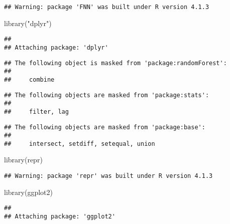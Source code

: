 \documentclass[
]{article}
\newenvironment{Shaded}{\begin{snugshade}}{\end{snugshade}}
\newcommand{\FunctionTok}[1]{\textcolor[rgb]{0.00,0.00,0.00}{#1}}
\newcommand{\NormalTok}[1]{#1}
\newcommand{\StringTok}[1]{\textcolor[rgb]{0.31,0.60,0.02}{#1}}
\begin{document}
\begin{verbatim}
## Warning: package 'FNN' was built under R version 4.1.3
\end{verbatim}

\begin{Shaded}
\begin{Highlighting}[]
\FunctionTok{library}\NormalTok{(}\StringTok{"dplyr"}\NormalTok{)    }
\end{Highlighting}
\end{Shaded}

\begin{verbatim}
## 
## Attaching package: 'dplyr'
\end{verbatim}

\begin{verbatim}
## The following object is masked from 'package:randomForest':
## 
##     combine
\end{verbatim}

\begin{verbatim}
## The following objects are masked from 'package:stats':
## 
##     filter, lag
\end{verbatim}

\begin{verbatim}
## The following objects are masked from 'package:base':
## 
##     intersect, setdiff, setequal, union
\end{verbatim}

\begin{Shaded}
\begin{Highlighting}[]
\FunctionTok{library}\NormalTok{(}\StringTok{\textquotesingle{}repr\textquotesingle{}}\NormalTok{)}
\end{Highlighting}
\end{Shaded}

\begin{verbatim}
## Warning: package 'repr' was built under R version 4.1.3
\end{verbatim}

\begin{Shaded}
\begin{Highlighting}[]
\FunctionTok{library}\NormalTok{(}\StringTok{\textquotesingle{}ggplot2\textquotesingle{}}\NormalTok{)}
\end{Highlighting}
\end{Shaded}

\begin{verbatim}
## 
## Attaching package: 'ggplot2'
\end{verbatim}
\end{document}

